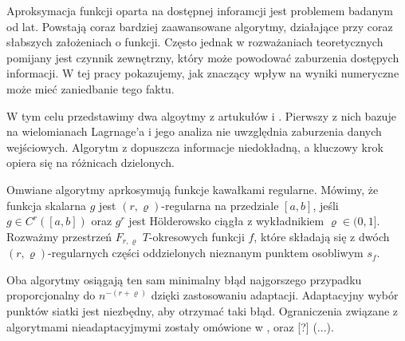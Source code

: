 \documentclass[oik, pdftex, robocza, man]{mgrwms}
\begin{document}
\begin{wstep}[Wprowadzenie]
    Aproksymacja funkcji oparta na dostępnej inforamcji jest problemem badanym od lat. Powstają coraz bardziej zaawansowane algorytmy, działające przy coraz słabszych założeniach o funkcji. Często jednak w rozważaniach teoretycznych pomijany jest czynnik zewnętrzny, który może powodować zaburzenia dostępych informacji. W tej pracy pokazujemy, jak znaczący wpływ na wyniki numeryczne może mieć zaniedbanie tego faktu.

    W tym celu przedstawimy dwa algoytmy z artukułów \cite{AoP} i \cite{CoDF}. Pierwszy z nich bazuje na wielomianach Lagrnage'a i jego analiza nie uwzględnia zaburzenia danych wejściowych. Algorytm z \cite{AoP} dopuszcza informacje niedokładną, a kluczowy krok opiera się na różnicach dzielonych. 

    Omwiane algorytmy aprkosymują funkcje kawałkami regularne. Mówimy, że funkcja skalarna $g$ jest $(r, \varrho)$-regularna na przedziale $[a,b]$, jeśli $g \in C^{r}([a,b])$ oraz $g^{r}$ jest Hölderowsko ciągła z wykładnikiem $\varrho \in (0,1]$. Rozważmy przestrzeń $F_{r,\varrho}$ $T$-okresowych funkcji $f$, które składają się z dwóch $(r,\varrho)$-regularnych części oddzielonych nieznanym punktem osobliwym $s_{f}$.
    
    Oba algorytmy osiągają ten sam minimalny błąd najgorszego przypadku proporcjonalny do $n^{-(r + \varrho)}$ dzięki zastosowaniu adaptacji. Adaptacyjny wybór punktów siatki jest niezbędny, aby otrzymać taki błąd. Ograniczenia związane z algorytmami nieadaptacyjmymi zostały omówione w \cite{UA}, \cite{PoA} oraz [?] (...).



\end{wstep}
\end{document}
